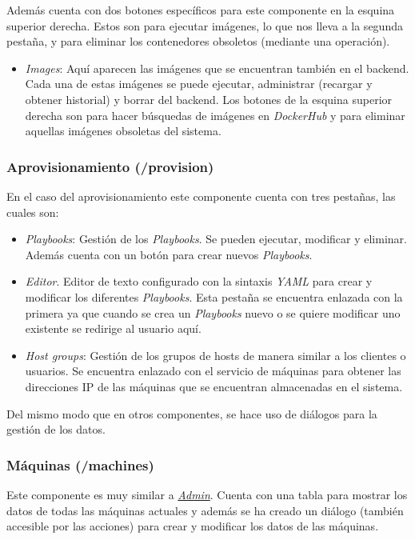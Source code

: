 \bigskip
Además cuenta con dos botones específicos para este componente en la esquina superior derecha. Estos son para ejecutar imágenes, lo que nos lleva a la segunda pestaña, y para eliminar los contenedores obsoletos (mediante una operación).
\begin{itemize}
	\item \textit{Images}: Aquí aparecen las imágenes que se encuentran también en el backend. Cada una de estas imágenes se puede ejecutar, administrar (recargar y obtener historial) y borrar del backend. Los botones de la esquina superior derecha son para hacer búsquedas de imágenes en \textit{DockerHub} y para eliminar aquellas imágenes obsoletas del sistema.
\end{itemize}




\subsubsection{Aprovisionamiento (/provision)}


En el caso del aprovisionamiento este componente cuenta con tres pestañas, las cuales son:
\begin{itemize}
	\item \textit{Playbooks}: Gestión de los \textit{Playbooks}. Se pueden ejecutar, modificar y eliminar. Además cuenta con un botón para crear nuevos \textit{Playbooks}.
	\item \textit{Editor}. Editor de texto configurado con la sintaxis \textit{YAML} para crear y modificar los diferentes \textit{Playbooks}. Esta pestaña se encuentra enlazada con la primera ya que cuando se crea un \textit{Playbooks} nuevo o se quiere modificar uno existente se redirige al usuario aquí.
	\item \textit{Host groups}: Gestión de los grupos de hosts de manera similar a los clientes o usuarios. Se encuentra enlazado con el servicio de máquinas para obtener las direcciones IP de las máquinas que se encuentran almacenadas en el sistema.
\end{itemize}

Del mismo modo que en otros componentes, se hace uso de diálogos para la gestión de los datos.


\subsubsection{Máquinas (/machines)}

Este componente es muy similar a \hyperref[sec:admin]{\textit{Admin}}. Cuenta con una tabla para mostrar los datos de todas las máquinas actuales y además se ha creado un diálogo (también accesible por las acciones) para crear y modificar los datos de las máquinas.


